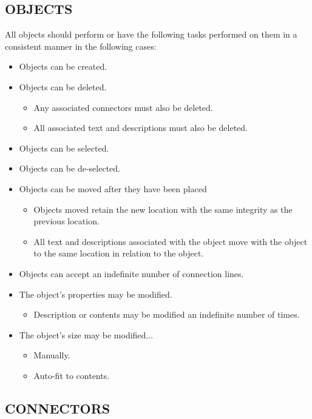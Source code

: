 \documentclass[twoside,letterpaper]{article}
\begin{document}
\subsection[OBJECTS]{\bfseries OBJECTS} 

All objects should perform or have the following tasks performed on them in a consistent manner in the following cases: 
\begin{itemize}
	\item Objects can be created.
	\item Objects can be deleted.
\begin{itemize}
\item Any associated connectors must also be deleted.
\item All associated text and descriptions must also be deleted.
\end{itemize}
	\item Objects can be selected.
	\item Objects can be de-selected.
	\item Objects can be moved after they have been placed
\begin{itemize}
\item Objects moved retain the new location with the same integrity as the previous location.
\item All text and descriptions associated with the object move with the object to the same location in relation to the object.
\end{itemize}
\item Objects can accept an indefinite number of connection lines.
	\item The object's properties may be modified.
\begin{itemize}
\item Description or contents may be modified an indefinite number of times.
\end{itemize}
	\item The object's size may be modified...
	\begin{itemize}
		\item Manually.
		\item Auto-fit to contents.
\end{itemize}
\end{itemize}

\bigskip

\subsection[CONNECTORS]{\bfseries CONNECTORS}
\end{document}
